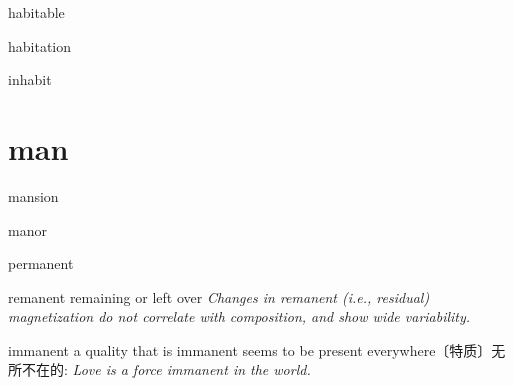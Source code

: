 \begin{RefWord}{habitable}
\end{RefWord}

\begin{RefWord}{habitation}
\end{RefWord}

\begin{RefWord}{inhabit}
\end{RefWord}


\section{man}

\begin{RefWord}{mansion}
\end{RefWord}

\begin{RefWord}{manor}
\end{RefWord}

\begin{RefWord}{permanent}
\end{RefWord}

\begin{RefWord}{remanent}
    remaining or left over
    \textit{Changes in remanent (i.e., residual) magnetization do not correlate with composition, and show wide variability.}
\end{RefWord}

\begin{RefWord}{immanent}
    a quality that is immanent seems to be present everywhere〔特质〕无所不在的:
   \textit{ Love is a force immanent in the world.}
\end{RefWord}